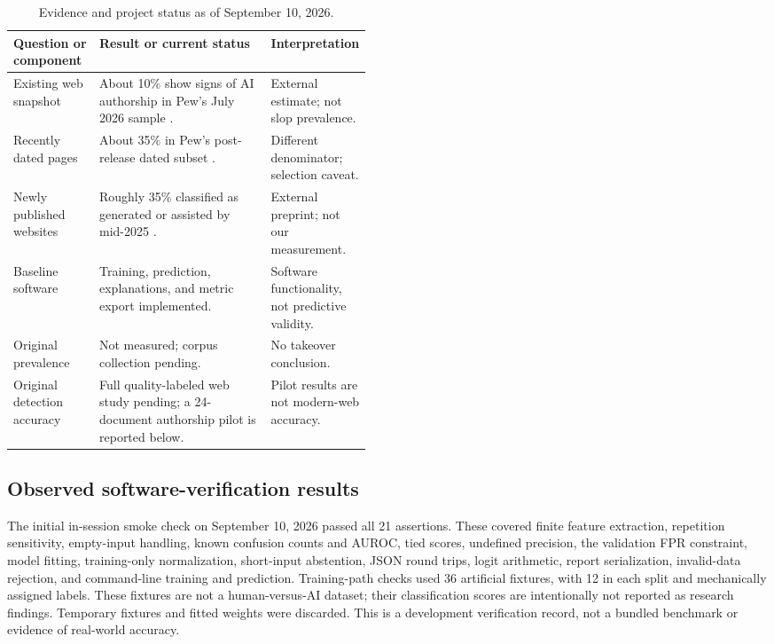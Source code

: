 \documentclass[11pt]{article}
\begin{document}
\begin{table}[htbp]
\centering\small
\begin{tabularx}{\linewidth}{@{}>{\raggedright\arraybackslash}p{0.24\linewidth}>{\raggedright\arraybackslash}X>{\raggedright\arraybackslash}p{0.23\linewidth}@{}}
\toprule
Question or component & Result or current status & Interpretation \\
\midrule
Existing web snapshot & About 10\% show signs of AI authorship in Pew's July 2026 sample \cite{pew}. & External estimate; not slop prevalence. \\
Recently dated pages & About 35\% in Pew's post-release dated subset \cite{pewmethods}. & Different denominator; selection caveat. \\
Newly published websites & Roughly 35\% classified as generated or assisted by mid-2025 \cite{dolezal}. & External preprint; not our measurement. \\
Baseline software & Training, prediction, explanations, and metric export implemented. & Software functionality, not predictive validity. \\
Original prevalence & Not measured; corpus collection pending. & No takeover conclusion. \\
Original detection accuracy & Full quality-labeled web study pending; a 24-document authorship pilot is reported below. & Pilot results are not modern-web accuracy. \\
\bottomrule
\end{tabularx}
\caption{Evidence and project status as of September 10, 2026.}
\label{tab:status}
\end{table}

\subsection{Observed software-verification results}
The initial in-session smoke check on September 10, 2026 passed all 21
assertions. These covered finite feature extraction, repetition sensitivity, empty-input
handling, known confusion counts and AUROC, tied scores, undefined precision,
the validation FPR constraint, model fitting, training-only normalization,
short-input abstention, JSON round trips, logit arithmetic, report serialization,
invalid-data rejection, and command-line training and prediction. Training-path
checks used 36 artificial fixtures, with 12 in each split and mechanically
assigned labels. These fixtures are not a human-versus-AI dataset; their
classification scores are intentionally not reported as research findings.
Temporary fixtures and fitted weights were discarded. This is a development
verification record, not a bundled benchmark or evidence of real-world accuracy.
\end{document}
